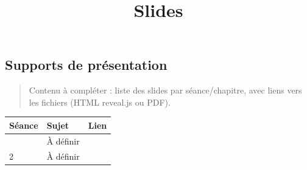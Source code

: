 \documentclass[
  french,
  12pt,
]{article}
\title{Slides}
\author{}
\date{}
\newcounter{none} %
\begin{document}
\maketitle


\subsection{Supports de présentation}\label{supports-de-pruxe9sentation}

\begin{quote}
Contenu à compléter : liste des slides par séance/chapitre, avec liens
vers les fichiers (HTML reveal.js ou PDF).
\end{quote}

{\def\LTcaptype{none} %
\begin{longtable}[]{@{}lll@{}}
\toprule\noalign{}
Séance & Sujet & Lien \\
\midrule\noalign{}
\endhead
\bottomrule\noalign{}
\endlastfoot
1 & À définir & \\
2 & À définir & \\
\end{longtable}
}
\end{document}
